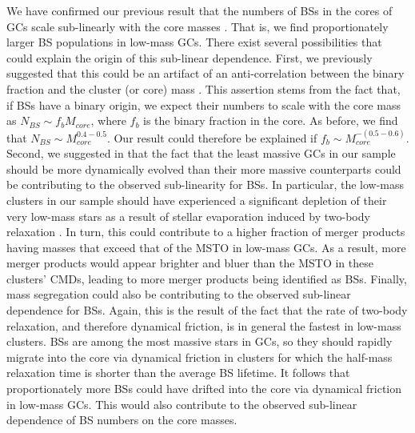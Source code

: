 We have confirmed our previous result that the numbers of BSs in the
cores of GCs scale sub-linearly with the core masses
\citep{knigge09}.  That is, we find proportionately larger BS
populations in low-mass GCs.  
There exist several possibilities that could explain the origin of
this sub-linear dependence.  First, we previously suggested 
that this could be an artifact of an anti-correlation between the binary
fraction and the cluster (or core) mass \citep{knigge09}.  This
assertion stems from the fact 
that, if BSs have a binary origin, we expect their numbers to scale
with the core mass as $N_{BS} \sim f_bM_{core}$, where $f_b$ is the binary
fraction in the core.  As before, we find that $N_{BS} \sim
M_{core}^{0.4-0.5}$.  Our result could therefore be explained if $f_b \sim
M_{core}^{-(0.5-0.6)}$.  Second, we suggested in \citet{leigh09} that
the fact that the least massive GCs in our sample should be
more dynamically evolved than their more massive
counterparts could be contributing to the observed sub-linearity for
BSs.  In particular, the low-mass clusters in our sample should have
experienced a significant depletion of their very low-mass stars as a
result of stellar evaporation induced by two-body relaxation 
\citep[e.g.][]{spitzer87, heggie03, demarchi10}.  In turn, this could contribute
to a higher fraction of merger products having masses that exceed that
of the MSTO in low-mass GCs.  As a result, more merger products would 
appear brighter and bluer than the MSTO in these clusters' CMDs,
leading to more merger products being identified as BSs.  Finally,
mass segregation could also be contributing to the observed sub-linear
dependence for BSs.  Again, this is the result of the fact that the
rate of two-body relaxation, and therefore dynamical friction, is in
general the 
fastest in low-mass clusters.  BSs are among the most massive stars in
GCs, so they should rapidly migrate into the core via 
dynamical friction in clusters for which the half-mass relaxation time
is shorter than the average BS lifetime.  It follows that proportionately
more BSs could have drifted into the core via dynamical friction in
low-mass GCs.  This would also contribute to the observed sub-linear
dependence of BS numbers on the core masses. 

